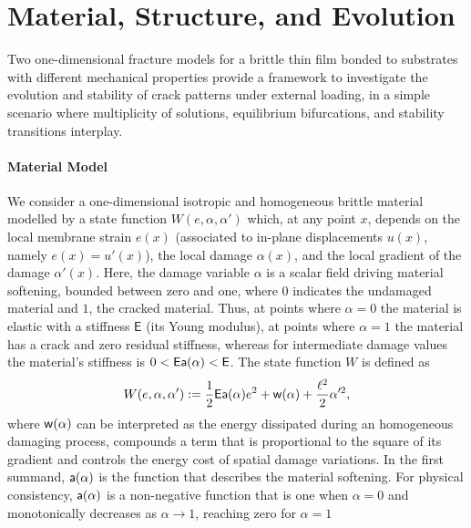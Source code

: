 \section{Material, Structure, and Evolution}
\label{sec:rigid}

Two one-dimensional fracture models for a brittle thin film bonded to substrates with different mechanical properties provide a framework to investigate the evolution and stability of crack patterns under external loading, in a  simple scenario where multiplicity of solutions, equilibrium bifurcations, and stability transitions interplay.


\paragraph{Material Model}
We consider a one-dimensional isotropic and homogeneous brittle material modelled by a state function $W(e, \alpha, \alpha')$ which, at any point $x$,
depends on the local membrane strain $e(x)$ (associated to in-plane displacements $u(x)$, namely $e(x) = u'(x)$), the local damage $\alpha(x)$, and the local gradient of the damage $\alpha'(x)$. 
Here, the damage variable $\alpha$ is a scalar field driving material softening, bounded between zero and one, where $0$ indicates the undamaged material and $1$, the cracked material. Thus, at points where $\alpha=0$ the material is elastic with a stiffness $\mathsf{E}$ (its Young modulus), at points where $\alpha=1$ the material has a crack and zero residual stiffness, whereas for intermediate damage values the material's stiffness is $0<\mathsf{E}\mathsf{a}(\alpha)< \mathsf{E}$.  
The state function $W$ is defined as 
\begin{equation}
    \label{def:energy_material}
    W(e, \alpha, \alpha'):= \frac{1}{2} \mathsf{E} \mathsf{a}(\alpha)e^2 +\mathsf{w}(\alpha) + \frac{\ell^2}{2}\alpha'^2,
\end{equation}
where $\mathsf{w}(\alpha)$ can be interpreted as the energy dissipated during an homogeneous damaging process, compounds a term that is proportional to the square of its gradient and controls the energy cost of spatial damage variations. In the first summand, $\mathsf{a}(\alpha)$ is the function that describes the material softening. %
For physical consistency, $\mathsf{a}(\alpha)$ is a non-negative function that is one when $\alpha=0$ and monotonically decreases as $\alpha\to 1$, reaching zero for $\alpha=1$  
